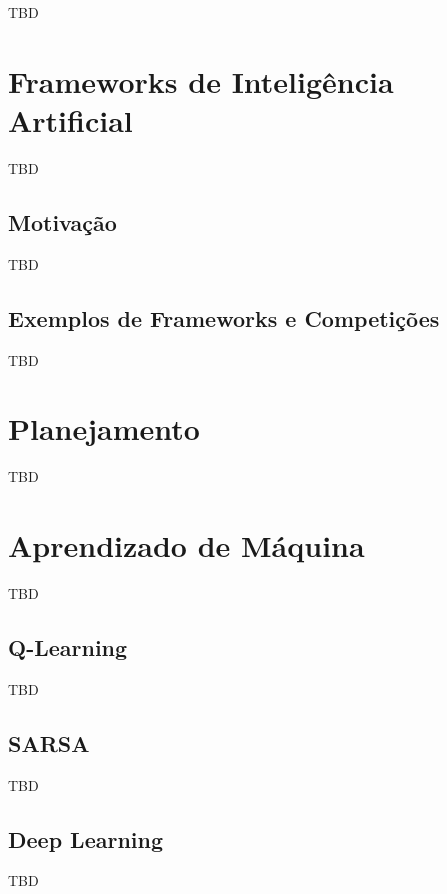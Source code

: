 TBD

\section{Frameworks de Inteligência Artificial}

TBD

\subsection{Motivação}

TBD

\subsection{Exemplos de Frameworks e Competições}

TBD

\section{Planejamento}

TBD

\section{Aprendizado de Máquina}

TBD

\subsection{Q-Learning}

TBD

\subsection{SARSA}

TBD

\subsection{Deep Learning}

TBD
